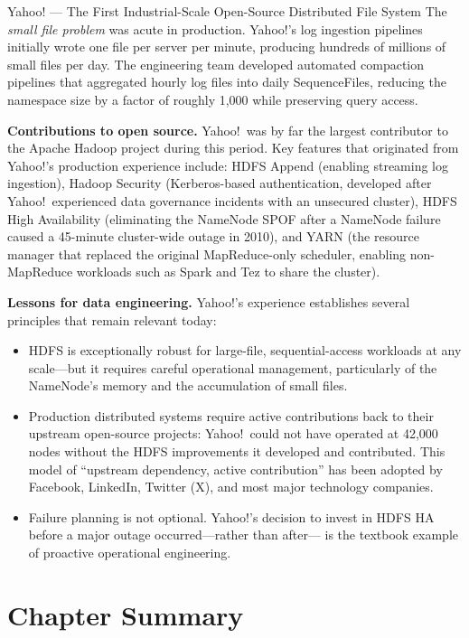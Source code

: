 \begin{casestudy}{Yahoo! --- The First Industrial-Scale Open-Source Distributed File System}
The \emph{small file problem} was acute in production. Yahoo!'s log
ingestion pipelines initially wrote one file per server per minute,
producing hundreds of millions of small files per day. The engineering
team developed automated compaction pipelines that aggregated hourly
log files into daily SequenceFiles, reducing the namespace size by a
factor of roughly 1,000 while preserving query access.

\smallskip
\textbf{Contributions to open source.}
Yahoo!\ was by far the largest contributor to the Apache Hadoop
project during this period. Key features that originated from Yahoo!'s
production experience include: HDFS Append (enabling streaming log
ingestion), Hadoop Security (Kerberos-based authentication, developed
after Yahoo!\ experienced data governance incidents with an unsecured
cluster), HDFS High Availability (eliminating the NameNode SPOF after
a NameNode failure caused a 45-minute cluster-wide outage in 2010),
and YARN (the resource manager that replaced the original
MapReduce-only scheduler, enabling non-MapReduce workloads such as
Spark and Tez to share the cluster).

\smallskip
\textbf{Lessons for data engineering.}
Yahoo!'s experience establishes several principles that remain
relevant today:
\begin{itemize}
  \item HDFS is exceptionally robust for large-file, sequential-access
        workloads at any scale---but it requires careful operational
        management, particularly of the NameNode's memory and the
        accumulation of small files.
  \item Production distributed systems require active contributions
        back to their upstream open-source projects: Yahoo!\ could not
        have operated at 42,000 nodes without the HDFS improvements it
        developed and contributed. This model of ``upstream dependency,
        active contribution'' has been adopted by Facebook, LinkedIn,
        Twitter (X), and most major technology companies.
  \item Failure planning is not optional. Yahoo!'s decision to invest
        in HDFS HA before a major outage occurred---rather than after---
        is the textbook example of proactive operational engineering.
\end{itemize}
\end{casestudy}

\section*{Chapter Summary}
\label{sec:ch3-summary}

